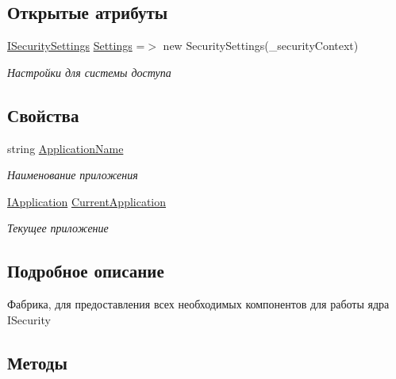 \subsection*{Открытые атрибуты}
\begin{DoxyCompactItemize}
\item 
\hyperlink{interface_security_1_1_interfaces_1_1_i_security_settings}{I\+Security\+Settings} \hyperlink{class_security_1_1_entity_framework_1_1_security_factory_aabcaa9d3afbf7699b0d6bc97166ed420}{Settings} =$>$ new Security\+Settings(\+\_\+security\+Context)
\begin{DoxyCompactList}\small\item\em Настройки для системы доступа \end{DoxyCompactList}\end{DoxyCompactItemize}
\subsection*{Свойства}
\begin{DoxyCompactItemize}
\item 
string \hyperlink{class_security_1_1_entity_framework_1_1_security_factory_af0ac32ad1ff78a21fde18963be1b913c}{Application\+Name}
\begin{DoxyCompactList}\small\item\em Наименование приложения \end{DoxyCompactList}\item 
\hyperlink{interface_security_1_1_interfaces_1_1_model_1_1_i_application}{I\+Application} \hyperlink{class_security_1_1_entity_framework_1_1_security_factory_a8e4b86a40c6e8db94020b80e7bcf4f19}{Current\+Application}
\begin{DoxyCompactList}\small\item\em Текущее приложение \end{DoxyCompactList}\end{DoxyCompactItemize}


\subsection{Подробное описание}
Фабрика, для предоставления всех необходимых компонентов для работы ядра I\+Security 



\subsection{Методы}
\mbox{\label{class_security_1_1_entity_framework_1_1_security_factory_a5405f1e0c85e32a61afab9026170a114}} 
